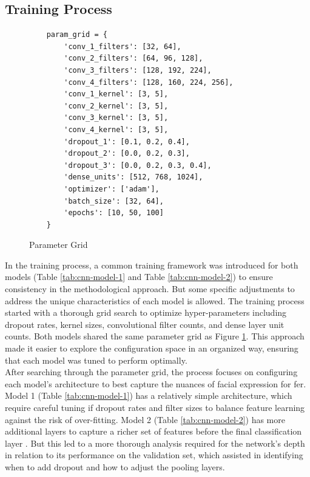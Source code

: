 \subsection{Training Process}
\begin{figure}[h!] 
    \centering
\begin{verbatim}
    param_grid = {
        'conv_1_filters': [32, 64],
        'conv_2_filters': [64, 96, 128],
        'conv_3_filters': [128, 192, 224],
        'conv_4_filters': [128, 160, 224, 256],
        'conv_1_kernel': [3, 5],
        'conv_2_kernel': [3, 5],
        'conv_3_kernel': [3, 5],
        'conv_4_kernel': [3, 5],
        'dropout_1': [0.1, 0.2, 0.4],
        'dropout_2': [0.0, 0.2, 0.3],
        'dropout_3': [0.0, 0.2, 0.3, 0.4],
        'dense_units': [512, 768, 1024],
        'optimizer': ['adam'],
        'batch_size': [32, 64],  
        'epochs': [10, 50, 100] 
    }
\end{verbatim}
    \caption{Parameter Grid}
    \label{fig:param_grid}
\end{figure}
In the training process, a common training framework was introduced for both models (Table \ref{tab:cnn-model-1} and Table \ref{tab:cnn-model-2}) to ensure consistency in the methodological approach.
But some specific adjustments to address the unique characteristics of each model is allowed.
The training process started with a thorough grid search to optimize hyper-parameters including dropout rates, kernel sizes, convolutional filter counts, and dense layer unit counts.
Both models shared the same parameter grid as Figure \ref{fig:param_grid}.
This approach made it easier to explore the configuration space in an organized way, ensuring that each model was tuned to perform optimally.
\\
\indent After searching through the parameter grid, the process focuses on configuring each model's architecture to best capture the nuances of facial expression for \gls{fer}.
Model 1 (Table \ref{tab:cnn-model-1}) has a relatively simple architecture, which require careful tuning if dropout rates and filter sizes to balance feature learning against the risk of over-fitting.
Model 2 (Table \ref{tab:cnn-model-2}) has more additional layers to capture a richer set of features before the final classification layer . 
But this led to a more thorough analysis required for the network's depth in relation to its performance on the validation set, which assisted in identifying when to add dropout and how to adjust the pooling layers.  
